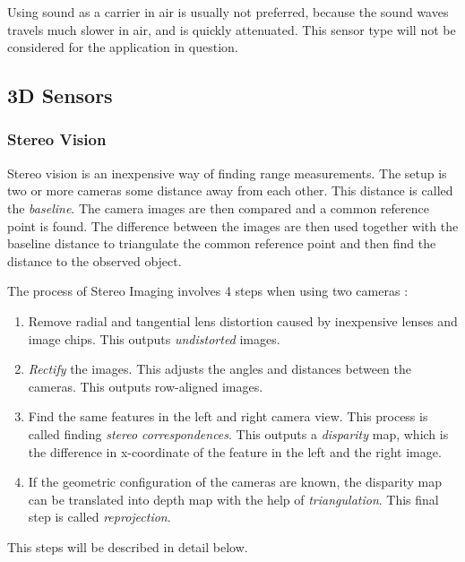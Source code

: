 Using sound as a carrier in air is usually not preferred, because the sound waves travels
much slower in air, and is quickly attenuated. This sensor type will not be considered for
the application in question. 


\subsection{3D Sensors}

\subsubsection{Stereo Vision}
Stereo vision is an inexpensive way of finding range measurements. The setup is two or
more cameras some distance away from each other. This distance is called the
\emph{baseline}. The camera images are then compared and a common reference point is
found. The difference between the images are then used together with the baseline distance
to triangulate the common reference point and then find the distance to the observed
object. 

The process of Stereo Imaging involves 4 steps when using two cameras \cite{openCV}:
\begin{enumerate}
    \item Remove radial and tangential lens distortion caused by inexpensive lenses and
        image chips. This outputs \emph{undistorted} images. 
    \item \emph{Rectify} the images. This adjusts the angles and distances between the cameras.
        This outputs row-aligned images.
    \item Find the same features in the left and right camera view. This process is called
        finding \emph{stereo correspondences}. This outputs a \emph{disparity} map, which
        is the difference in x-coordinate of the feature in the left and the right image. 
    \item If the geometric configuration of the cameras are known, the disparity map can
        be translated into depth map with the help of \emph{triangulation}. This final
        step is called \emph{reprojection}.
\end{enumerate}
This steps will be described in detail below. 


